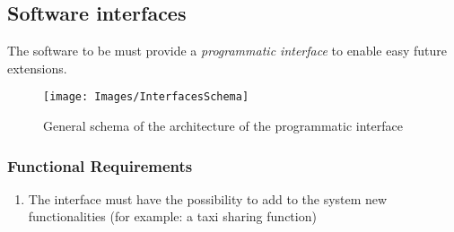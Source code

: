 \pagebreak
\subsection{Software interfaces}
The software to be must provide a \textit{programmatic interface} to enable easy future extensions.

\begin{figure}[H]
\centering
\texttt{[image: Images/InterfacesSchema]}
\caption{General schema of the architecture of the programmatic interface}
\end{figure}

\subsubsection{Functional Requirements}
\begin{enumerate}
\item The interface must have the possibility to add to the system new functionalities (for example: a taxi sharing function)
\end{enumerate}